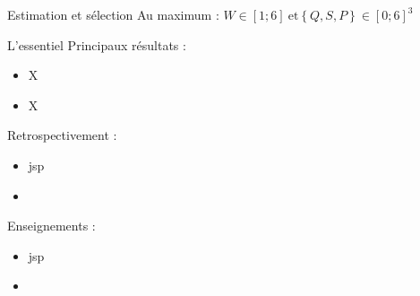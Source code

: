 \documentclass[9pt, xcolor={dvipsnames}]{beamer}
\begin{document}
\begin{frame}[label=est]{Estimation et sélection}
  Au maximum : $W\in[1;6]\ \textrm{et} \left\{Q,S,P\right\}\in[0;6]^{3}$
\end{frame}

\begin{frame}{L'essentiel}
  Principaux résultats :
  \begin{itemize}
    \item X
    \item X
  \end{itemize}
  \vspace{.2cm}
  Retrospectivement :
  \begin{itemize}
    \item jsp
    \item 
  \end{itemize}
  \vspace{.2cm}
  Enseignements :
  \begin{itemize}
    \item jsp
    \item 
  \end{itemize}
\end{frame}

\end{document}
